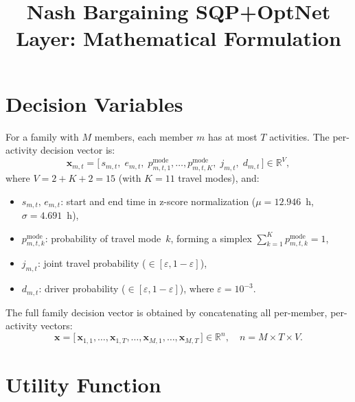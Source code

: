 \documentclass[11pt,a4paper]{article}
\title{Nash Bargaining SQP+OptNet Layer: Mathematical Formulation}
\author{}
\date{}
\newcommand{\R}{\mathbb{R}}
\begin{document}
\maketitle

\section{Decision Variables}

For a family with $M$ members, each member $m$ has at most $T$ activities.
The per-activity decision vector is:
\begin{equation}
    \mathbf{x}_{m,t} = \bigl[\, s_{m,t},\; e_{m,t},\; p^{\mathrm{mode}}_{m,t,1}, \dots, p^{\mathrm{mode}}_{m,t,K},\; j_{m,t},\; d_{m,t} \,\bigr] \in \R^{V},
    \label{eq:decision_vector}
\end{equation}
where $V = 2 + K + 2 = 15$ (with $K=11$ travel modes), and:
\begin{itemize}
    \item $s_{m,t},\, e_{m,t}$: start and end time in z-score normalization ($\mu = 12.946$~h, $\sigma = 4.691$~h),
    \item $p^{\mathrm{mode}}_{m,t,k}$: probability of travel mode~$k$, forming a simplex $\sum_{k=1}^K p^{\mathrm{mode}}_{m,t,k} = 1$,
    \item $j_{m,t}$: joint travel probability ($\in [\varepsilon, 1-\varepsilon]$),
    \item $d_{m,t}$: driver probability ($\in [\varepsilon, 1-\varepsilon]$), where $\varepsilon = 10^{-3}$.
\end{itemize}

The full family decision vector is obtained by concatenating all per-member, per-activity vectors:
\begin{equation}
    \mathbf{x} = \bigl[\, \mathbf{x}_{1,1}, \dots, \mathbf{x}_{1,T}, \dots, \mathbf{x}_{M,1}, \dots, \mathbf{x}_{M,T} \,\bigr] \in \R^n, \quad n = M \times T \times V.
    \label{eq:full_vector}
\end{equation}


\section{Utility Function}
\end{document}
